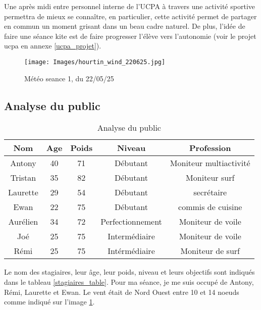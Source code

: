 \documentclass[11pt,a4paper]{report}
\begin{document}
Une après midi entre personnel interne de l'UCPA à travers une 
activité sportive permettra  de mieux se connaître, 
en particulier, cette activité permet de partager en commun
un moment grisant dans un beau cadre naturel. De plus, l'idée
de faire une séance kite est de faire progresser l'élève vers 
l'autonomie (voir le projet ucpa en annexe \ref{ucpa_projet}).


\begin{figure}
\centering
\texttt{[image: Images/hourtin\_wind\_220625.jpg]} 
\caption{Météo seance 1, du 22/05/25\label{meteo}}
\end{figure}

\subsection{Analyse du public}
\begin{table}
\begin{tabular}{|c|c|c|c|c|}
        \hline
        \textbf{Nom}& \textbf{Age} & \textbf{Poids}& \textbf{Niveau}     &  \textbf{Profession} \\ 
        \hline
       Antony      &  40         &  71           &    Débutant          & Moniteur multiactivité  \\
       \hline
        Tristan       &  35          & 82            &  Débutant           & Moniteur surf  \\
        \hline
        Laurette      &  29          & 54            &  Débutant           & secrétaire \\
        \hline
        Ewan          &  22          & 75            & Débutant            & commis de cuisine  \\
        \hline
         Aurélien      &  34          &  72           &   Perfectionnement  & Moniteur de voile \\
         \hline
        Joé           &  25          &  75           &   Intermédiaire     & Moniteur de voile \\
        \hline
        Rémi          &  25          & 75            &  Intérmédiaire           &  Moniteur de surf  \\
        \hline
\end{tabular}
\caption{Analyse du public\label{analyse_public}}
\end{table}
Le nom des stagiaires, leur \^age, leur poids, niveau et  leurs objectifs sont
indiqués dans le tableau \ref{stagiaires_table}.
Pour ma séance, je me suis occupé de Antony, Rémi, Laurette et Ewan.
 Le vent était de Nord Ouest entre 
10 et 14 noeuds comme indiqué sur l'image \ref{meteo}.
\end{document}
